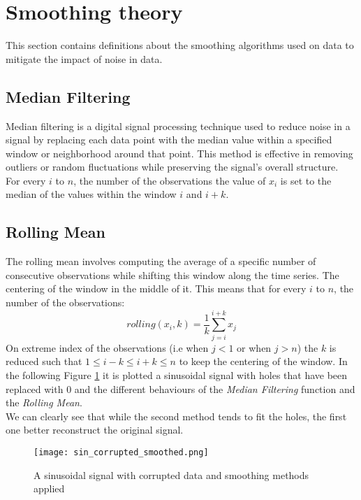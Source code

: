 \section{Smoothing theory}
This section contains definitions about the smoothing algorithms used on data to mitigate the impact of noise in data.

\subsection{Median Filtering}
Median filtering is a digital signal processing technique used to reduce noise in a signal by replacing each data point with the median value within a specified window or neighborhood around that point. 
This method is effective in removing outliers or random fluctuations while preserving the signal's overall structure.\\
For every $i$ to $n$, the number of the observations the value of $x_i$ is set to the median of the values within the window $i$ and $i+k$.

\subsection{Rolling Mean}
The rolling mean involves computing the average of a specific number of consecutive observations while shifting this window along the time series.
The centering of the window in the middle of it.
This means that for every $i$ to $n$, the number of the observations:
\begin{equation}
  rolling(x_i,k) = \frac{1}{k} \sum_{j=i}^{i+k} x_j
  \label{eq:rolling_mean}
\end{equation}
On extreme index of the observations (i.e when $j < 1$ or when $j > n$) the $k$ is reduced such that $1 \leq i-k \leq i+k \leq n$ to keep the centering of the window.
In the following Figure \ref{fig:sin_corrupted_smooted} it is plotted a sinusoidal signal with holes that have been replaced with 0 and the different behaviours of the \textit{Median Filtering} function and the \textit{Rolling Mean}. \\
We can clearly see that while the second method tends to fit the holes, the first one better reconstruct the original signal.
\begin{figure}[H]
  \centering  
    \texttt{[image: sin\_corrupted\_smoothed.png]}
    \caption{A sinusoidal signal with corrupted data and smoothing methods applied}
    \label{fig:sin_corrupted_smooted}
\end{figure}


